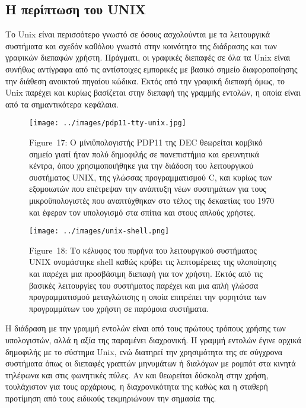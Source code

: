 \documentclass[
]{article}
\begin{document}
\hypertarget{ux3b7-ux3c0ux3b5ux3c1ux3afux3c0ux3c4ux3c9ux3c3ux3b7-ux3c4ux3bfux3c5-unix}{%
\subsection{Η περίπτωση του
UNIX}\label{ux3b7-ux3c0ux3b5ux3c1ux3afux3c0ux3c4ux3c9ux3c3ux3b7-ux3c4ux3bfux3c5-unix}}

Το Unix είναι περισσότερο γνωστό σε όσους ασχολούνται με τα λειτουργικά
συστήματα και σχεδόν καθόλου γνωστό στην κοινότητα της διάδρασης και των
γραφικών διεπαφών χρήστη. Πράγματι, οι γραφικές διεπαφές σε όλα τα Unix
είναι συνήθως αντίγραφα από τις αντίστοιχες εμπορικές με βασικό σημείο
διαφοροποίησης την διάθεση ανοικτού πηγαίου κώδικα. Εκτός από την
γραφική διεπαφή όμως, το Unix παρέχει και κυρίως βασίζεται στην διεπαφή
της γραμμής εντολών, η οποία είναι από τα σημαντικότερα κεφάλαια.

\leavevmode{}%
\begin{figure}
\hypertarget{fig:pdp11-tty-unix}{%
\centering
\texttt{[image: ../images/pdp11-tty-unix.jpg]}
\caption{Figure~17: Ο μίνιϋπολογιστής PDP11 της DEC θεωρείται κομβικό
σημείο γιατί ήταν πολύ δημοφιλής σε πανεπιστήμια και ερευνητικά κέντρα,
όπου χρησιμοποιήθηκε για την διάδοση του λειτουργικού συστήματος UNIX,
της γλώσσας προγραμματισμού C, και κυρίως των εξομοιωτών που επέτρεψαν
την ανάπτυξη νέων συστημάτων για τους μικροϋπολογιστές που αναπτύχθηκαν
στο τέλος της δεκαετίας του 1970 και έφεραν τον υπολογισμό στα σπίτια
και στους απλούς χρήστες.}\label{fig:pdp11-tty-unix}
}
\end{figure}

\leavevmode{}%
\begin{figure}
\hypertarget{fig:unix-shell}{%
\centering
\texttt{[image: ../images/unix-shell.png]}
\caption{Figure~18: Το κέλυφος του πυρήνα του λειτουργικού συστήματος
UNIX ονομάστηκε shell καθώς κρύβει τις λεπτομέρειες της υλοποίησης και
παρέχει μια προσβάσιμη διεπαφή για τον χρήστη. Εκτός από τις βασικές
λειτουργίες του συστήματος παρέχει και μια απλή γλώσσα προγραμματισμού
μεταγλώτισης η οποία επιτρέπει την φορητότα των προγραμμάτων του χρήστη
σε παρόμοια συστήματα.}\label{fig:unix-shell}
}
\end{figure}

Η διάδραση με την γραμμή εντολών είναι από τους πρώτους τρόπους χρήσης
των υπολογιστών, αλλά η αξία της παραμένει διαχρονική. Η γραμμή εντολών
έγινε αρχικά δημοφιλής με το σύστημα Unix, ενώ διατηρεί την χρησιμότητα
της σε σύγχρονα συστήματα όπως οι διεπαφές γραπτών μηνυμάτων ή διαλόγων
με ρομπότ στα κινητά τηλέφωνα και στις φωνητικές πύλες. Αν και θεωρείται
δύσκολη στην χρήση, τουλάχιστον για τους αρχάριους, η διαχρονικότητα της
καθώς και η σταθερή προτίμηση από τους ειδικούς τεκμηριώνουν την σημασία
της.
\end{document}
